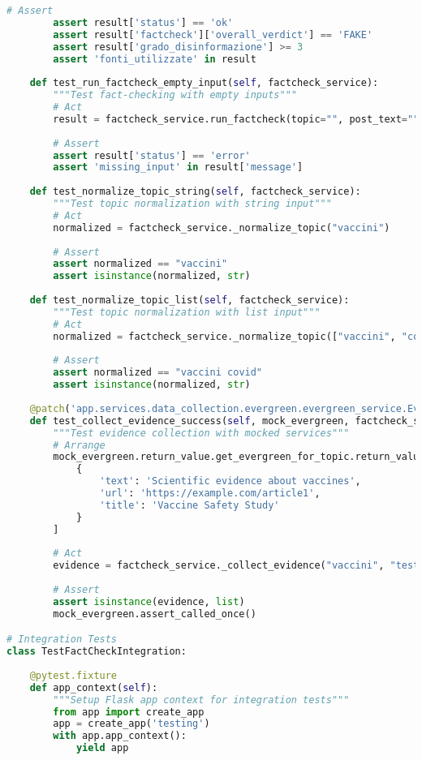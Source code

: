 \documentclass[12pt,a4paper]{report}
\begin{document}
\begin{lstlisting}[language=python, caption=Example Unit Tests - FactCheck Service]
        # Assert
        assert result['status'] == 'ok'
        assert result['factcheck']['overall_verdict'] == 'FAKE'
        assert result['grado_disinformazione'] >= 3
        assert 'fonti_utilizzate' in result
    
    def test_run_factcheck_empty_input(self, factcheck_service):
        """Test fact-checking with empty inputs"""
        # Act
        result = factcheck_service.run_factcheck(topic="", post_text="")
        
        # Assert
        assert result['status'] == 'error'
        assert 'missing_input' in result['message']
    
    def test_normalize_topic_string(self, factcheck_service):
        """Test topic normalization with string input"""
        # Act
        normalized = factcheck_service._normalize_topic("vaccini")
        
        # Assert
        assert normalized == "vaccini"
        assert isinstance(normalized, str)
    
    def test_normalize_topic_list(self, factcheck_service):
        """Test topic normalization with list input"""
        # Act
        normalized = factcheck_service._normalize_topic(["vaccini", "covid"])
        
        # Assert
        assert normalized == "vaccini covid"
        assert isinstance(normalized, str)
    
    @patch('app.services.data_collection.evergreen.evergreen_service.EverGreenService')
    def test_collect_evidence_success(self, mock_evergreen, factcheck_service):
        """Test evidence collection with mocked services"""
        # Arrange
        mock_evergreen.return_value.get_evergreen_for_topic.return_value = [
            {
                'text': 'Scientific evidence about vaccines',
                'url': 'https://example.com/article1',
                'title': 'Vaccine Safety Study'
            }
        ]
        
        # Act
        evidence = factcheck_service._collect_evidence("vaccini", "test post")
        
        # Assert
        assert isinstance(evidence, list)
        mock_evergreen.assert_called_once()

# Integration Tests
class TestFactCheckIntegration:
    
    @pytest.fixture
    def app_context(self):
        """Setup Flask app context for integration tests"""
        from app import create_app
        app = create_app('testing')
        with app.app_context():
            yield app
    

\end{lstlisting}
\end{document}

